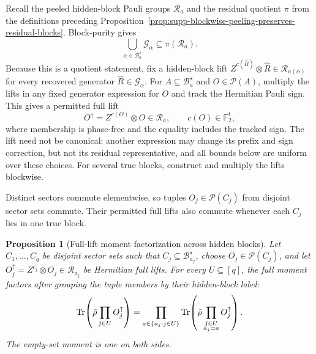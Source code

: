 \documentclass[
  aps,
  prx,
  reprint,
  superscriptaddress,
  amsmath,
  amssymb,
  nofootinbib,
  longbibliography
]{revtex4-2}
\newtheorem{proposition}[theorem]{Proposition}
\begin{document}
Recall the peeled hidden-block Pauli groups $\mathcal R_a$ and the residual
quotient $\pi$ from the definitions preceding
Proposition~\ref{prop:supp-blockwise-peeling-preserves-residual-blocks}.
Block-purity gives
\begin{equation}
\bigcup_{\alpha\in\mathcal B_a^\star}\mathcal G_\alpha
\subseteq
\pi(\mathcal R_a).
\end{equation}
Because this is a quotient statement, fix a hidden-block lift
$Z^{c(\widehat R)}\otimes\widehat R\in\mathcal R_{a(\alpha)}$ for every
recovered generator $\widehat R\in\mathcal G_\alpha$.  For
$A\subseteq\mathcal B_a^\star$ and $O\in\mathcal P(A)$, multiply the lifts
in any fixed generator expression for $O$ and track the Hermitian Pauli sign.
This gives a permitted full lift
\begin{equation}
O^\uparrow
=
Z^{c(O)}\otimes O
\in
\mathcal R_a,
\qquad
c(O)\in\mathbb F_2^t,
\label{eq:supp-generated-full-lift}
\end{equation}
where membership is phase-free and the equality includes the tracked sign.
The lift need not be canonical: another expression may change its prefix and
sign correction, but not its residual representative, and all bounds below
are uniform over these choices.  For several true blocks, construct and
multiply the lifts blockwise.

Distinct sectors commute elementwise, so tuples
$O_j\in\mathcal P(C_j)$ from disjoint sector sets commute.  Their permitted
full lifts also commute whenever each $C_j$ lies in one true block.

\begin{proposition}[Full-lift moment factorization across hidden blocks]
\label{prop:supp-full-lift-moment-factorization}
Let $C_1,\dots,C_q$ be disjoint sector sets such that
$C_j\subseteq\mathcal B_{a_j}^\star$, choose
$O_j\in\mathcal P(C_j)$, and let
$O_j^\uparrow=Z^{c_j}\otimes O_j\in\mathcal R_{a_j}$ be Hermitian full lifts.
For every $U\subseteq[q]$, the full moment factors after grouping the tuple
members by their hidden-block label:
\begin{equation}
\Tr\!\left(
\tilde\rho\prod_{j\in U}O_j^\uparrow
\right)
=
\prod_{a\in\{a_j:j\in U\}}
\Tr\!\left(
\tilde\rho
\prod_{\substack{j\in U\\a_j=a}}O_j^\uparrow
\right).
\label{eq:supp-true-block-moment-factorization}
\end{equation}
The empty-set moment is one on both sides.
\end{proposition}
\end{document}

